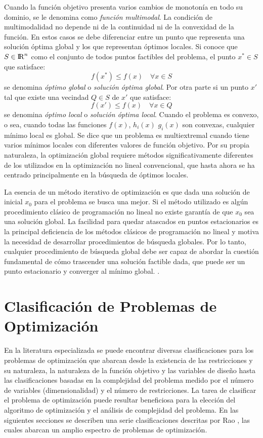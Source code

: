 Cuando la función objetivo presenta varios cambios de monotonía en todo su dominio, se le denomina como \textit{función multimodal}. La condición de multimodalidad no depende ni de la continuidad ni de la convexidad de la función. En estos casos se debe diferenciar entre un punto que representa una solución óptima global y los que representan óptimos locales. Si conoce que $S \in {\rm I\!R}^{n}$ como el conjunto de todos puntos factibles del problema, el punto $x^* \in S$  que satisface:
\begin{equation}
f(x^*) \leq f(x) \quad \forall x \in S
\end{equation}
se denomina \textit{óptimo global} o \textit{solución óptima global}. Por otra parte si un punto $x'$  tal que existe una vecindad $Q \in S$ de $x'$ que satisface:
\begin{equation}
f(x') \leq f(x) \quad \forall x \in Q
\end{equation}
se denomina \textit{óptimo local} o \textit{solución óptima local}. Cuando el problema es convexo, o sea, cuando todas las funciones $f(x)$, $h_i(x)$ $g_i(x)$ son convexas, cualquier mínimo local es global. Se dice que un problema es multiextremal cuando tiene varios mínimos locales con diferentes valores de función objetivo. Por su propia naturaleza, la optimización global requiere métodos significativamente diferentes de los utilizados en la optimización no lineal convencional, que hasta ahora se ha centrado principalmente en la búsqueda de óptimos locales.

La esencia de un método iterativo de optimización es que dada una solución de inicial $x_0$ para el problema se busca una mejor. Si el método utilizado es algún procedimiento clásico de programación no lineal no existe garantía de que $x_0$ sea una solución global. La facilidad para quedar atascados en puntos estacionarios es la principal deficiencia de los métodos clásicos de programación no lineal y motiva la necesidad de desarrollar procedimientos de búsqueda globales. Por lo tanto, cualquier procedimiento de búsqueda global debe ser capaz de abordar la cuestión fundamental de cómo trascender una solución factible dada, que puede ser un punto estacionario y converger al mínimo global.
\cite{tuy_convex_2015}.

\section{Clasificación de Problemas de Optimización}
En la literatura especializada se puede encontrar diversas clasificaciones para los problemas de optimización que abarcan desde la existencia de las restricciones y su naturaleza, la naturaleza de la función objetivo y las variables de diseño hasta las clasificaciones basadas en la complejidad del problema medido por el número de variables (dimensionalidad) y el número de restricciones\cite{luenberger_linear_2015}. La tarea de clasificar el problema de optimización puede resultar beneficiosa para la elección del algoritmo de optimización y el análisis de complejidad del problema. En las siguientes secciones se describen una serie clasificaciones descritas por Rao \cite{rao_engineering_2009}, las cuales abarcan un amplio espectro de problemas de optimización.

